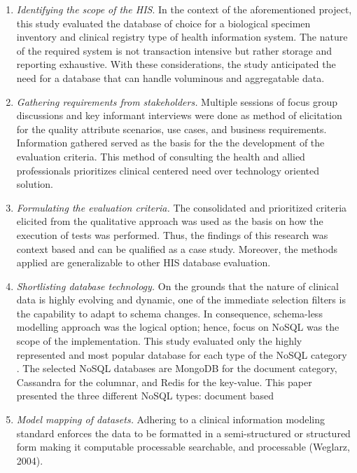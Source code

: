 \documentclass[5p]{elsarticle}
\begin{document}
\begin{enumerate}
\item \emph{Identifying the scope of the HIS}. In the context of the aforementioned project, this study evaluated the database of choice for a biological specimen inventory and clinical registry type of health information system. The nature of the required system is not transaction intensive but rather storage and reporting exhaustive. With these considerations, the study anticipated the need for a database that can handle voluminous and aggregatable data.
\item \emph{Gathering requirements from stakeholders.} Multiple sessions of focus group discussions and key informant interviews were done as method of elicitation for the quality attribute scenarios, use cases, and business requirements. 
Information gathered served as the basis for the the development of the evaluation criteria. 
This method of consulting the health and allied professionals prioritizes clinical centered need over technology oriented solution.
\item \emph{Formulating the evaluation criteria.} The consolidated and prioritized criteria elicited from the qualitative approach was used as the basis on how the execution of tests was performed. Thus, the findings of this research was context based and can be qualified as a case study. Moreover, the methods applied are generalizable to other HIS database evaluation.
\item \emph{Shortlisting database technology.} On the grounds that the nature of clinical data is highly evolving and dynamic, one of the immediate selection filters is the capability to adapt to schema changes. In consequence, schema-less modelling approach was the logical option; hence, focus on NoSQL was the scope of the implementation. 
This study evaluated only the highly represented and most popular database for each type of the NoSQL category \cite{DBEnginesRanking2018}.
The selected NoSQL databases are MongoDB for the document category, Cassandra for the columnar, and Redis for the key-value.
This paper presented the three different NoSQL types: document based
\item \emph{Model mapping of datasets.} 
Adhering to a clinical information modeling standard enforces the data to be formatted in a semi-structured or structured form making it computable processable searchable, and processable (Weglarz, 2004).


\end{enumerate}
\end{document}
